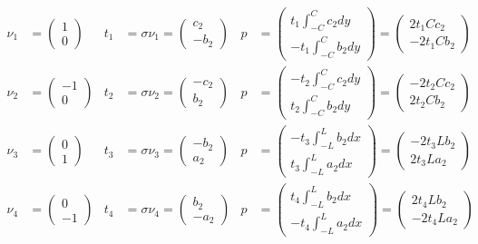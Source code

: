 \documentclass[a4paper,10pt,twoside,final,spanish]{article}
\begin{document}
\begin{enumerate}[a.]
\begin{align*}
\nu_{1} &= \begin{pmatrix}
1 \\
0
\end{pmatrix}
& t_{1} &= \sigma\nu_{1}=\begin{pmatrix}
c_{2} \\
-b_{2}
\end{pmatrix}
& p &= \begin{pmatrix}
t_{1}\int_{-C}^{C}c_{2}dy \\
-t_{1}\int_{-C}^{C}b_{2}dy
\end{pmatrix}
=\begin{pmatrix}
2t_{1}Cc_{2} \\
-2t_{1}Cb_{2}
\end{pmatrix} \\
\nu_{2} &= \begin{pmatrix}
-1 \\
0
\end{pmatrix}
& t_{2} &= \sigma\nu_{2}=\begin{pmatrix}
-c_{2} \\
b_{2}
\end{pmatrix}
& p &= \begin{pmatrix}
-t_{2}\int_{-C}^{C}c_{2}dy \\
t_{2}\int_{-C}^{C}b_{2}dy
\end{pmatrix}
=\begin{pmatrix}
-2t_{2}Cc_{2} \\
2t_{2}Cb_{2}
\end{pmatrix} \\
\nu_{3} &= \begin{pmatrix}
0 \\
1
\end{pmatrix}
& t_{3} &= \sigma\nu_{3}=\begin{pmatrix}
-b_{2} \\
a_{2}
\end{pmatrix}
& p &= \begin{pmatrix}
-t_{3}\int_{-L}^{L}b_{2}dx \\
t_{3}\int_{-L}^{L}a_{2}dx
\end{pmatrix}
=\begin{pmatrix}
-2t_{3}Lb_{2} \\
2t_{3}La_{2}
\end{pmatrix} \\
\nu_{4} &= \begin{pmatrix}
0 \\
-1
\end{pmatrix}
& t_{4} &= \sigma\nu_{4}=\begin{pmatrix}
b_{2} \\
-a_{2}
\end{pmatrix}
& p &= \begin{pmatrix}
t_{4}\int_{-L}^{L}b_{2}dx \\
-t_{4}\int_{-L}^{L}a_{2}dx
\end{pmatrix}
=\begin{pmatrix}
2t_{4}Lb_{2} \\
-2t_{4}La_{2}
\end{pmatrix}
\end{align*}


\end{enumerate}
\end{document}
